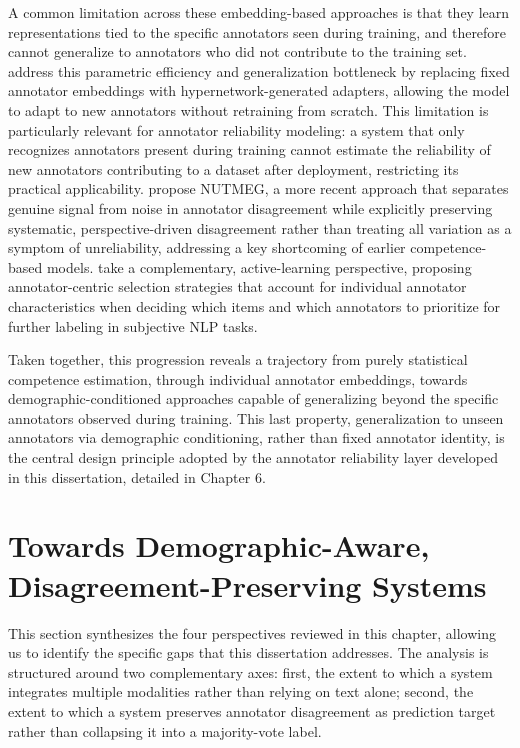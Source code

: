 A common limitation across these embedding-based approaches is that they learn
representations tied to the specific annotators seen during training, and therefore
cannot generalize to annotators who did not contribute to the training set.
\cite{ignatev2025hypernetworks} address this parametric efficiency and generalization
bottleneck by replacing fixed annotator embeddings with hypernetwork-generated
adapters, allowing the model to adapt to new annotators without retraining from
scratch. This limitation is particularly relevant for annotator reliability modeling: a
system that only recognizes annotators present during training cannot estimate the
reliability of new annotators contributing to a dataset after deployment, restricting its
practical applicability. \cite{ivey2025nutmeg} propose NUTMEG, a more recent approach
that separates genuine signal from noise in annotator disagreement while explicitly
preserving systematic, perspective-driven disagreement rather than treating all variation
as a symptom of unreliability, addressing a key shortcoming of earlier competence-based
models. \cite{vandermeer2024annotator} take a complementary, active-learning perspective,
proposing annotator-centric selection strategies that account for individual annotator
characteristics when deciding which items and which annotators to prioritize for further
labeling in subjective NLP tasks.

Taken together, this progression reveals a trajectory from purely statistical competence
estimation, through individual annotator embeddings, towards demographic-conditioned
approaches capable of generalizing beyond the specific annotators observed during
training. This last property, generalization to unseen annotators via demographic
conditioning, rather than fixed annotator identity, is the central design principle
adopted by the annotator reliability layer developed in this dissertation, detailed in
Chapter 6.

\section{Towards Demographic-Aware, Disagreement-Preserving Systems}\label{sec:demographic-aware-disagreement-preserving}

This section synthesizes the four perspectives reviewed in this chapter, allowing us to
identify the specific gaps that this dissertation addresses. The analysis is structured around
two complementary axes: first, the extent to which a system integrates multiple modalities
rather than relying on text alone; second, the extent to which a system preserves annotator
disagreement as prediction target rather than collapsing it into a majority-vote label.

